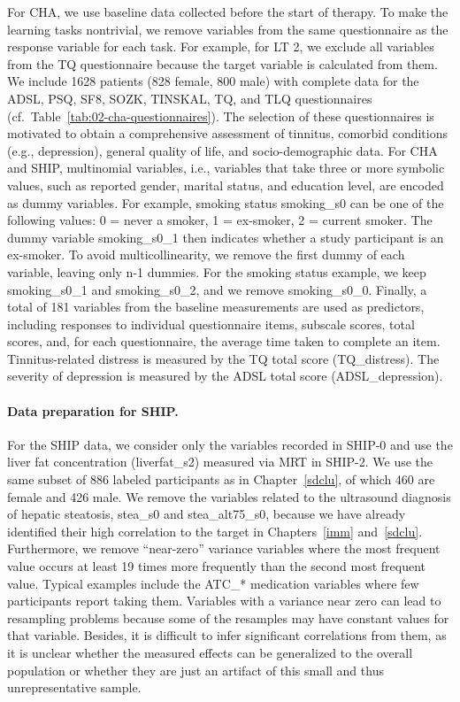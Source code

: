 \documentclass[
  oneside]{book}
\begin{document}
For CHA, we use baseline data collected before the start of therapy.
To make the learning tasks nontrivial, we remove variables from the same questionnaire as the response variable for each task.
For example, for LT 2, we exclude all variables from the TQ questionnaire because the target variable is calculated from them.
We include 1628 patients (828 female, 800 male) with complete data for the ADSL, PSQ, SF8, SOZK, TINSKAL, TQ, and TLQ questionnaires (cf.~Table~\ref{tab:02-cha-questionnaires}).
The selection of these questionnaires is motivated to obtain a comprehensive assessment of tinnitus, comorbid conditions (e.g., depression), general quality of life, and socio-demographic data.
For CHA and SHIP, multinomial variables, i.e., variables that take three or more symbolic values, such as reported gender, marital status, and education level, are encoded as dummy variables.
For example, smoking status smoking\_s0 can be one of the following values: 0 = never a smoker, 1 = ex-smoker, 2 = current smoker.
The dummy variable smoking\_s0\_1 then indicates whether a study participant is an ex-smoker.
To avoid multicollinearity, we remove the first dummy of each variable, leaving only n-1 dummies.
For the smoking status example, we keep smoking\_s0\_1 and smoking\_s0\_2, and we remove smoking\_s0\_0.
Finally, a total of 181 variables from the baseline measurements are used as predictors, including responses to individual questionnaire items, subscale scores, total scores, and, for each questionnaire, the average time taken to complete an item.
Tinnitus-related distress is measured by the TQ total score (TQ\_distress).
The severity of depression is measured by the ADSL total score (ADSL\_depression).

\paragraph*{Data preparation for SHIP.}

For the SHIP data, we consider only the variables recorded in SHIP-0 and use the liver fat concentration (liverfat\_s2) measured via MRT in SHIP-2.
We use the same subset of 886 labeled participants as in Chapter~\ref{sdclu}, of which 460 are female and 426 male.
We remove the variables related to the ultrasound diagnosis of hepatic steatosis, stea\_s0 and stea\_alt75\_s0, because we have already identified their high correlation to the target in Chapters~\ref{imm} and~\ref{sdclu}.
Furthermore, we remove ``near-zero'' variance variables where the most frequent value occurs at least 19 times more frequently than the second most frequent value.
Typical examples include the ATC\_* medication variables where few participants report taking them.
Variables with a variance near zero can lead to resampling problems because some of the resamples may have constant values for that variable.
Besides, it is difficult to infer significant correlations from them, as it is unclear whether the measured effects can be generalized to the overall population or whether they are just an artifact of this small and thus unrepresentative sample.
\end{document}
